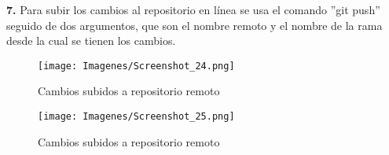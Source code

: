 \noindent \textbf{7.} Para subir los cambios al repositorio en línea se usa el comando ''git push'' seguido de dos argumentos, que son el nombre remoto y el nombre de la rama desde la cual se tienen los cambios.

\begin{figure}[H]
    \centering
    \texttt{[image: Imagenes/Screenshot\_24.png]}
    \caption{Cambios subidos a repositorio remoto}
    \label{fig:onlinerepo1}
\end{figure}

\begin{figure}[H]
    \centering
    \texttt{[image: Imagenes/Screenshot\_25.png]}
    \caption{Cambios subidos a repositorio remoto}
    \label{fig:onlinerepo1}
\end{figure}

